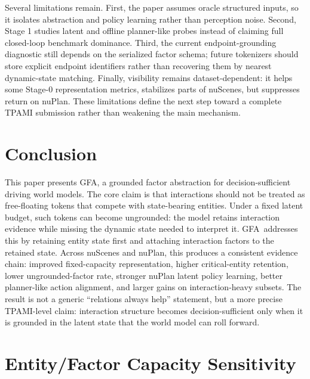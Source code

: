 \documentclass[journal]{IEEEtran}
\newcommand{\method}{\textsc{GFA}}
\begin{document}
Several limitations remain. First, the paper assumes oracle structured inputs, so it isolates abstraction and policy learning rather than perception noise. Second, Stage 1 studies latent and offline planner-like probes instead of claiming full closed-loop benchmark dominance. Third, the current endpoint-grounding diagnostic still depends on the serialized factor schema; future tokenizers should store explicit endpoint identifiers rather than recovering them by nearest dynamic-state matching. Finally, visibility remains dataset-dependent: it helps some Stage-0 representation metrics, stabilizes parts of nuScenes, but suppresses return on nuPlan. These limitations define the next step toward a complete TPAMI submission rather than weakening the main mechanism.

\section{Conclusion}
This paper presents \method, a grounded factor abstraction for decision-sufficient driving world models. The core claim is that interactions should not be treated as free-floating tokens that compete with state-bearing entities. Under a fixed latent budget, such tokens can become ungrounded: the model retains interaction evidence while missing the dynamic state needed to interpret it. \method\ addresses this by retaining entity state first and attaching interaction factors to the retained state. Across nuScenes and nuPlan, this produces a consistent evidence chain: improved fixed-capacity representation, higher critical-entity retention, lower ungrounded-factor rate, stronger nuPlan latent policy learning, better planner-like action alignment, and larger gains on interaction-heavy subsets. The result is not a generic ``relations always help'' statement, but a more precise TPAMI-level claim: interaction structure becomes decision-sufficient only when it is grounded in the latent state that the world model can roll forward.


\appendices
\section{Entity/Factor Capacity Sensitivity}
\end{document}
